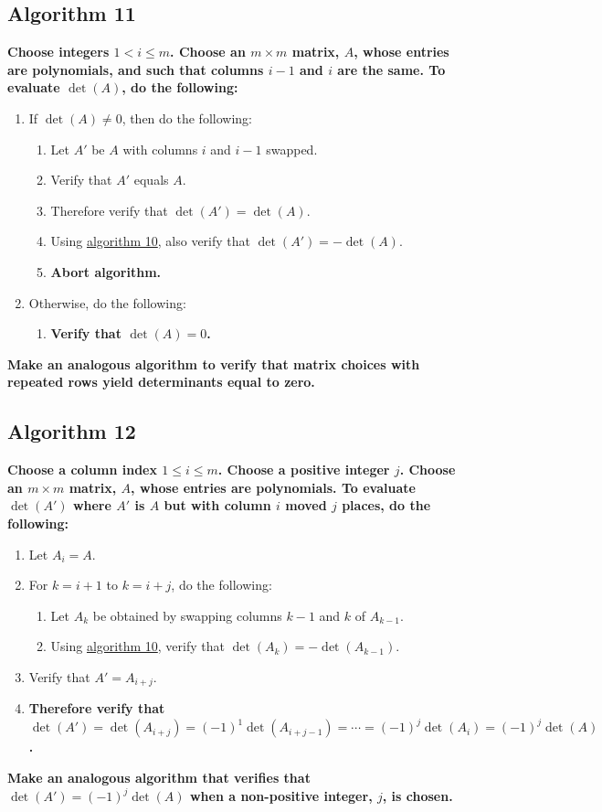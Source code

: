 \documentclass[twocolumn]{article}
\begin{document}
		\subsection{Algorithm 11}\label{sec:algorithm 11}
			\textbf{Choose integers $1<i\le m$. Choose an $m\times m$ matrix, $A$, whose entries are polynomials, and such that columns $i-1$ and $i$ are the same. To evaluate $\det(A)$, do the following:}
			\begin{enumerate}
				\item If $\det(A)\ne 0$, then do the following:
				\begin{enumerate}
					\item Let $A'$ be $A$ with columns $i$ and $i-1$ swapped.
					\item Verify that $A'$ equals $A$.
					\item Therefore verify that $\det(A')=\det(A)$.
					\item Using \hyperref[sec:algorithm 10]{algorithm 10}, also verify that $\det(A')=-\det(A)$.
					\item \textbf{Abort algorithm.}
				\end{enumerate}
				\item Otherwise, do the following:
				\begin{enumerate}
					\item \textbf{Verify that $\det(A)=0$.}
				\end{enumerate}
			\end{enumerate}
			\textbf{Make an analogous algorithm to verify that matrix choices with repeated rows yield determinants equal to zero.}
		\subsection{Algorithm 12}\label{sec:algorithm 12}
			\textbf{Choose a column index $1\le i\le m$. Choose a positive integer $j$. Choose an $m\times m$ matrix, $A$, whose entries are polynomials. To evaluate $\det(A')$ where $A'$ is $A$ but with column $i$ moved $j$ places, do the following:}
			\begin{enumerate}
				\item Let $A_i=A$.
				\item For $k=i+1$ to $k=i+j$, do the following:
				\begin{enumerate}
					\item Let $A_k$ be obtained by swapping columns $k-1$ and $k$ of $A_{k-1}$.
					\item Using \hyperref[sec:algorithm 10]{algorithm 10}, verify that $\det(A_k)=-\det(A_{k-1})$.
				\end{enumerate}
				\item Verify that $A'=A_{i+j}$.
				\item \textbf{Therefore verify that $\det(A')=\det(A_{i+j})=(-1)^1\det(A_{i+j-1})=\cdots=(-1)^j\det(A_{i})=(-1)^j\det(A)$.}
			\end{enumerate}
			\textbf{Make an analogous algorithm that verifies that $\det(A')=(-1)^j\det(A)$ when a non-positive integer, $j$, is chosen.}
			
\end{document}
